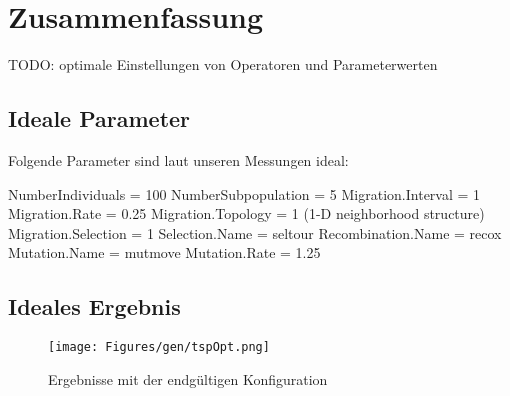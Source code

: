 \section{Zusammenfassung}\label{conclusion}

TODO: optimale Einstellungen von Operatoren und Parameterwerten

\subsection{Ideale Parameter}

Folgende Parameter sind laut unseren Messungen ideal:

NumberIndividuals = 100
NumberSubpopulation = 5
Migration.Interval = 1
Migration.Rate = 0.25
Migration.Topology = 1 (1-D neighborhood structure)
Migration.Selection = 1
Selection.Name = seltour
Recombination.Name = recox
Mutation.Name = mutmove
Mutation.Rate = 1.25

\subsection{Ideales Ergebnis}



\begin{figure}[h!]
  \centering
  \texttt{[image: Figures/gen/tspOpt.png]}
  \caption{Ergebnisse mit der endgültigen Konfiguration}\label{fig.tspOpt}
\end{figure}

